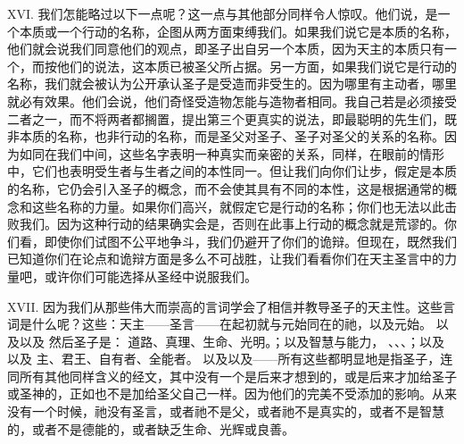XVI. 我们怎能略过以下一点呢？这一点与其他部分同样令人惊叹。他们说，是一个本质或一个行动的名称，企图从两方面束缚我们。如果我们说它是本质的名称，他们就会说我们同意他们的观点，即圣子出自另一个本质，因为天主的本质只有一个，而按他们的说法，这本质已被圣父所占据。另一方面，如果我们说它是行动的名称，我们就会被认为公开承认圣子是受造而非受生的。因为哪里有主动者，哪里就必有效果。他们会说，他们奇怪受造物怎能与造物者相同。我自己若是必须接受二者之一，而不将两者都搁置，提出第三个更真实的说法，即最聪明的先生们，既非本质的名称，也非行动的名称，而是圣父对圣子、圣子对圣父的关系的名称。因为如同在我们中间，这些名字表明一种真实而亲密的关系，同样，在眼前的情形中，它们也表明受生者与生者之间的本性同一。但让我们向你们让步，假定是本质的名称，它仍会引入圣子的概念，而不会使其具有不同的本性，这是根据通常的概念和这些名称的力量。如果你们高兴，就假定它是行动的名称；你们也无法以此击败我们。因为这种行动的结果确实会是，否则在此事上行动的概念就是荒谬的。你们看，即使你们试图不公平地争斗，我们仍避开了你们的诡辩。但现在，既然我们已知道你们在论点和诡辩方面是多么不可战胜，让我们看看你们在天主圣言中的力量吧，或许你们可能选择从圣经中说服我们。\par

XVII. 因为我们从那些伟大而崇高的言词学会了相信并教导圣子的天主性。这些言词是什么呢？这些：天主——圣言——在起初就与元始同在的祂，以及元始。 以及以及 然后圣子是： 道路、真理、生命、光明。；以及智慧与能力， 、、、；以及 以及 主、君王、自有者、全能者。 以及以及——所有这些都明显地是指圣子，连同所有其他同样含义的经文，其中没有一个是后来才想到的，或是后来才加给圣子或圣神的，正如也不是加给圣父自己一样。因为他们的完美不受添加的影响。从来没有一个时候，祂没有圣言，或者祂不是父，或者祂不是真实的，或者不是智慧的，或者不是德能的，或者缺乏生命、光辉或良善。\par

